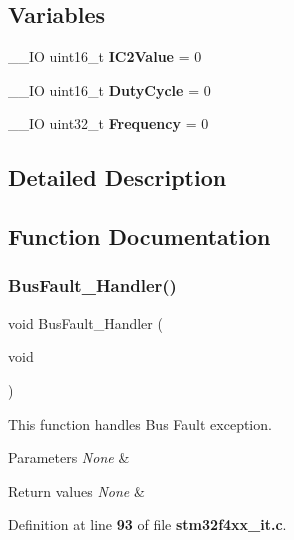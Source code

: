 \subsection*{Variables}
\begin{DoxyCompactItemize}
\item 
\+\_\+\+\_\+\+IO uint16\+\_\+t \textbf{ I\+C2\+Value} = 0
\item 
\+\_\+\+\_\+\+IO uint16\+\_\+t \textbf{ Duty\+Cycle} = 0
\item 
\+\_\+\+\_\+\+IO uint32\+\_\+t \textbf{ Frequency} = 0
\end{DoxyCompactItemize}


\subsection{Detailed Description}


\subsection{Function Documentation}
\mbox{\label{group__TIM__PWM__Input_ga850cefb17a977292ae5eb4cafa9976c3}} 
\subsubsection{Bus\+Fault\+\_\+\+Handler()}
{\footnotesize\ttfamily void Bus\+Fault\+\_\+\+Handler (\begin{DoxyParamCaption}\item[{void}]{ }\end{DoxyParamCaption})}



This function handles Bus Fault exception. 


\begin{DoxyParams}{Parameters}
{\em None} & \\
\hline
\end{DoxyParams}

\begin{DoxyRetVals}{Return values}
{\em None} & \\
\hline
\end{DoxyRetVals}


Definition at line \textbf{ 93} of file \textbf{ stm32f4xx\+\_\+it.\+c}.



